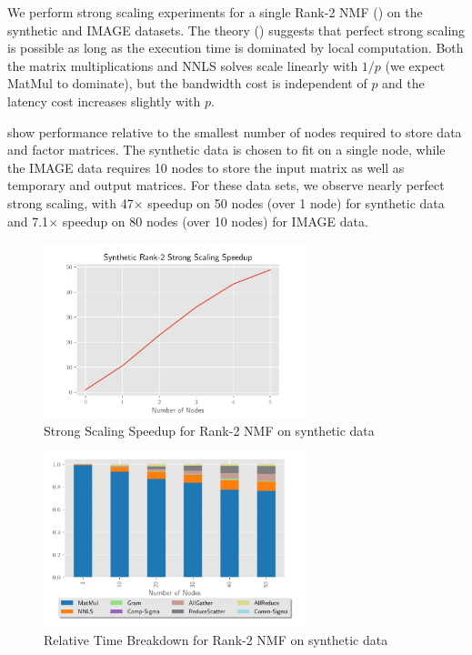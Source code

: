 \documentclass[conference,compsoc]{IEEEtran}
\begin{document}
We perform strong scaling experiments for a single Rank-2 NMF () on the synthetic and IMAGE datasets.
The theory () suggests that perfect strong scaling is possible as long as the execution time is dominated by local computation.
Both the matrix multiplications and NNLS solves scale linearly with $1/p$ (we expect MatMul to dominate), but the bandwidth cost is independent of $p$ and the latency cost increases slightly with $p$.

 show performance relative to the smallest number of nodes required to store data and factor matrices.
The synthetic data is chosen to fit on a single node, while the IMAGE data requires 10 nodes to store the input matrix as well as temporary and output matrices.
For these data sets, we observe nearly perfect strong scaling, with 47$\times$ speedup on 50 nodes (over 1 node) for synthetic data and 7.1$\times$ speedup on 80 nodes (over 10 nodes) for IMAGE data.

\begin{figure}
\begin{center}
\includegraphics[height=2in, width=\columnwidth]{plots/synthetic_rank2_speedup.pdf}
\caption{Strong Scaling Speedup for Rank-2 NMF on synthetic data}
\label{fig:synrank2speedup}
\end{center}
\end{figure}

\begin{figure}
\begin{center}
\includegraphics[height=2in, width=\columnwidth]{plots/synthetic_rank2_strongscaling.pdf}
\caption{Relative Time Breakdown for Rank-2 NMF on synthetic data}
\label{fig:synrank2strongscaling}
\end{center}
\end{figure}
\end{document}
